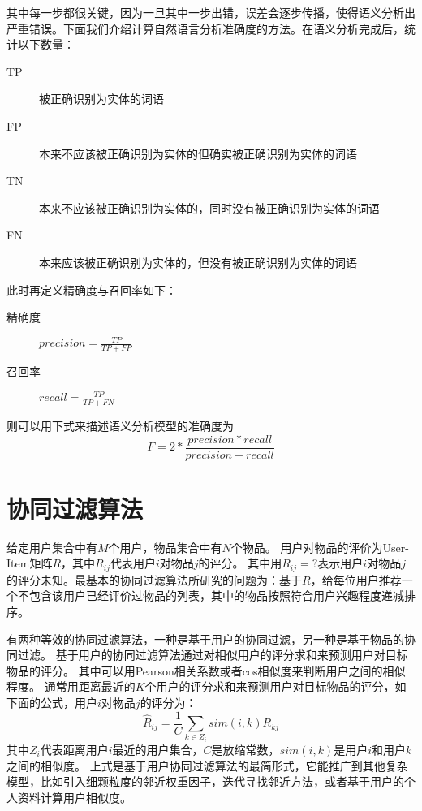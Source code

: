 其中每一步都很关键，因为一旦其中一步出错，误差会逐步传播，使得语义分析出严重错误。下面我们介绍计算自然语言分析准确度的方法。在语义分析完成后，统计以下数量：
\begin{center}
\begin{description}
	\item[TP]
	被正确识别为实体的词语
	\item[FP]
	本来不应该被正确识别为实体的但确实被正确识别为实体的词语
	\item[TN]
	本来不应该被正确识别为实体的，同时没有被正确识别为实体的词语
	\item[FN]
	本来应该被正确识别为实体的，但没有被正确识别为实体的词语
\end{description}
\end{center}
此时再定义精确度与召回率如下：
\begin{center}
\begin{description}
	\item[精确度]
	$precision= \frac{TP}{TP+FP} $
	\item[召回率]
	$recall= \frac{TP}{TP+FN} $
\end{description}
\end{center}
则可以用下式来描述语义分析模型的准确度为
\[
F= 2* \frac{precision*recall}{precision+recall}
\]
\section{协同过滤算法}
给定用户集合中有$M$个用户，物品集合中有$N$个物品。
用户对物品的评价为User-Item矩阵$R$，其中$R_{ij}$代表用户$i$对物品$j$的评分。
其中用$R_{ij}=?$表示用户$i$对物品$j$的评分未知。最基本的协同过滤算法所研究的问题为：基于$R$，给每位用户推荐一个不包含该用户已经评价过物品的列表，其中的物品按照符合用户兴趣程度递减排序。

有两种等效的协同过滤算法，一种是基于用户的协同过滤，另一种是基于物品的协同过滤。
基于用户的协同过滤算法通过对相似用户的评分求和来预测用户对目标物品的评分\parencite{resnick1994grouplens}。
其中可以用Pearson相关系数或者cos相似度来判断用户之间的相似程度\parencite{Singhal2001Modern}。
通常用距离最近的$K$个用户的评分求和来预测用户对目标物品的评分，如下面的公式，用户$i$对物品$j$的评分为：
\[
	\hat{R}_{ij} = \frac{1}{C} \sum_{k\in Z_i} sim(i,k)R_{kj}
\]
其中$Z_i$代表距离用户$i$最近的用户集合，$C$是放缩常数，$sim(i,k)$是用户$i$和用户$k$之间的相似度。
上式是基于用户协同过滤算法的最简形式\parencite{adomavicius2005toward}，它能推广到其他复杂模型，比如引入细颗粒度的邻近权重因子\parencite{herlocker2000explaining}，迭代寻找邻近方法\parencite{Zhang2007A}，或者基于用户的个人资料计算用户相似度\parencite{shi2009exploiting}。

